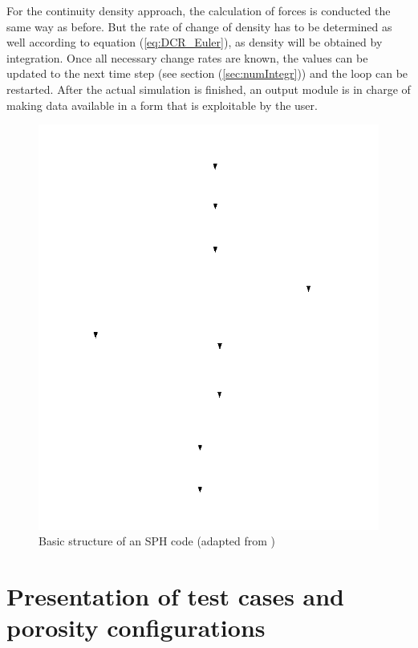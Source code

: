 \documentclass{report}
\begin{document}
For the continuity density approach, the calculation of forces is conducted the same way as before. But the rate of change of density 
has to be determined as well according to equation (\ref{eq:DCR_Euler}), as density will be obtained by integration. 
Once all necessary change rates are known, the values can be updated to the next time step (see section (\ref{sec:numIntegr})) and the loop can be restarted. After the actual simulation is finished, an output module is in charge of making data available in a form that is exploitable by the user.

\begin{figure}[!htbp]
  \centering
     \includegraphics[width=1.0\textwidth]{Graphics/general_structure_SPH}
  \caption{Basic structure of an SPH code (adapted from \cite{Liu2003}) }
  \label{fig:BasicSphCode}
\end{figure}

\section{Presentation of test cases and porosity configurations}
\label{sec:GenIntroTestCases}
 
\end{document}
